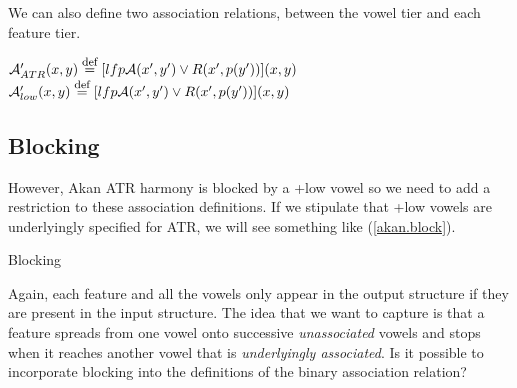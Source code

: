 \documentclass[,doc,floatsintext]{apa6}
\def\defeq{\mathrel{\buildrel \mbox{\footnotesize def} \over =}}
\theoremstyle{definition}
\theoremstyle{definition}
\theoremstyle{definition}
\theoremstyle{remark}
\begin{document}
\noindent We can also define two association relations, between the
vowel tier and each feature tier.

\noindent \(\mathcal{A}_{ATR}'(x, y) \defeq [lfp\mathcal{A}(x', y') \vee R(x', p(y'))](x, y)\)\newline
\(\mathcal{A}_{low}'(x, y) \defeq [lfp\mathcal{A}(x', y') \vee R(x', p(y'))](x, y)\)

\subsection{Blocking}\label{blocking}

However, Akan ATR harmony is blocked by a +low vowel so we need to add a
restriction to these association definitions. If we stipulate that +low
vowels are underlyingly specified for ATR, we will see something like
(\ref{akan.block}).

\begin{exe}
  \ex \label{akan.block} Blocking\\
\end{exe}

\noindent Again, each feature and all the vowels only appear in the
output structure if they are present in the input structure. The idea
that we want to capture is that a feature spreads from one vowel onto
successive \emph{unassociated} vowels and stops when it reaches another
vowel that is \emph{underlyingly associated}. Is it possible to
incorporate blocking into the definitions of the binary association
relation?
\end{document}

